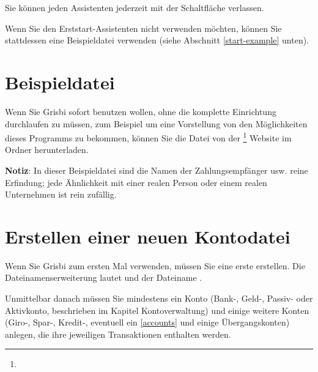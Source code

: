 Sie können jeden Assistenten jederzeit mit der Schaltfläche  verlassen.

Wenn Sie den Erststart-Assistenten nicht verwenden möchten, können Sie stattdessen eine Beispieldatei verwenden (siehe Abschnitt \ref{start-example} unten).

\section{Beispieldatei\label{start-example}}

Wenn Sie Grisbi sofort benutzen wollen, ohne die komplette Einrichtung durchlaufen zu müssen, zum Beispiel um eine Vorstellung von den Möglichkeiten dieses Programms zu bekommen, können Sie die Datei  von der \footnote{\urlSourceForgeDocumentation{}} Website im Ordner  herunterladen.

\textbf{Notiz}: In dieser Beispieldatei sind die Namen der Zahlungsempfänger usw. reine Erfindung; jede Ähnlichkeit mit einer realen Person oder einem realen Unternehmen ist rein zufällig.%

\section{Erstellen einer neuen Kontodatei\label{start-newfile}}

Wenn Sie Grisbi zum ersten Mal verwenden, müssen Sie eine erste  erstellen. Die \gls{Dateinamenserweiterung} lautet  und der Dateiname .%

Unmittelbar danach müssen Sie mindestens ein Konto (Bank-, Geld-, Passiv- oder Aktivkonto, beschrieben im Kapitel Kontoverwaltung) und einige weitere Konten (Giro-, Spar-, Kredit-, eventuell ein \vref{accounts}  und einige Übergangskonten) anlegen, die ihre jeweiligen Transaktionen enthalten werden.%

